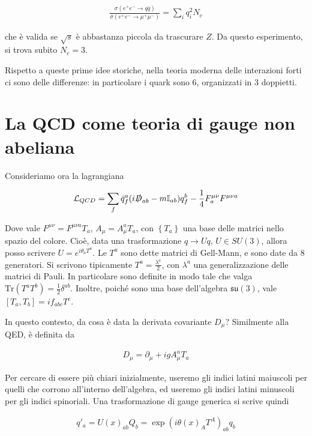 \documentclass[11pt]{report}
\begin{document}
\begin{align}
    \frac{\sigma (e^+e^- \to q\bar{q})}{\sigma (e^+e^- \to \mu^+ \mu^-)} = \sum_i q_i^2 N_c
\end{align}

che è valida se \(\sqrt{s}\) è abbastanza piccola da trascurare \(Z\). Da questo esperimento, si trova subito \(N_c = 3\). 

Rispetto a queste prime idee storiche, nella teoria moderna delle interazioni forti ci sono delle differenze: in particolare i quark sono 6, organizzati in 3 doppietti. 

\section{La QCD come teoria di gauge non abeliana}

Consideriamo ora la lagrangiana 

\begin{align}
    \mathcal{L}_{QCD} = \sum_f \bar{q}_f^a (i\slashed{D}_{ab} -m\mathbb{I}_{ab})q_f^b - \frac{1}{4}F^{\mu\nu}_a F^{\mu\nu a}
\end{align}

Dove vale \(F^{\mu\nu} = F^{\mu\nu a}T_a\), \(A_\mu = A_\mu^a T_a\), con \(\left\{ T_a \right\}\) una base delle matrici nello spazio del colore. Cioè, data una trasformazione \(q \to U q, \, U \in SU(3)\), allora posso scrivere \(U = e^{i\theta_a T^a}\). Le \(T^a\) sono dette matrici di Gell-Mann, e sono date da 8 generatori. Si scrivono tipicamente \(T^a = \frac{\lambda^a}{2}\), con \(\lambda^a\) una generalizzazione delle matrici di Pauli. In particolare sono definite in modo tale che valga \(\text{Tr}(T^a T^b) = \frac{1}{2}\delta^{ab}\). Inoltre, poiché sono una base dell'algebra \(\mathfrak{su}(3)\), vale \([T_a, T_b] = if_{abc}T^c\). 

In questo contesto, da cosa è data la derivata covariante \(D_\mu\)? Similmente alla QED, è definita da 

\begin{align}
    D_\mu = \partial_\mu + ig A_\mu^a T_a 
\end{align}

Per cercare di essere più chiari inizialmente, useremo gli indici latini maiuscoli per quelli che corrono all'interno dell'algebra, ed useremo gli indici latini minuscoli per gli indici spinoriali. Una trasformazione di gauge generica si scrive quindi 

\begin{align}
    q'_a = U(x)_{ab}Q_b = \exp(i\theta(x)_A T^A)_{ab}q_b
\end{align}
\end{document}
